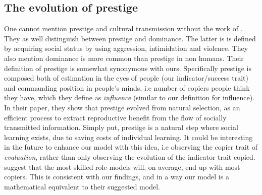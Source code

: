 \documentclass[11pt]{article}
\begin{document}
\subsection{The evolution of prestige \citep{prestige_evolution}}
One cannot mention prestige and cultural transmission without the work of \citet{prestige_evolution}. They as well distinguish between prestige and dominance. The latter is is defined by acquiring social status by using aggression, intimidation and violence. They also mention dominance is more common than prestige in non humans. Their definition of prestige is somewhat synonymous with ours. Specifically prestige is composed both of estimation in the eyes of people (our indicator/success trait) and commanding position in people's minds, i.e number of copiers people think they have, which they define as \textit{influence} (similar to our definition for influence).
In their paper, they show that prestige evolved from natural selection, as an efficient process to extract reproductive benefit from the flow of socially transmitted information. Simply put, prestige is a natural step where social learning exists, due to saving costs of individual learning.
It could be interesting in the future to enhance our model with this idea, i.e observing the copier trait of \textit{evaluation}, rather than only observing the evolution of the indicator trait copied.
\citet{prestige_evolution} suggest that the most skilled role-models will, on average, end up with most copiers. This is consistent with our findings, and in a way our model is a mathematical equivalent to their suggested model.

\clearpage


\end{document}
